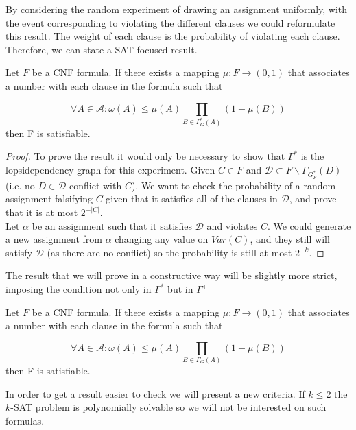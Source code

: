 By considering the random experiment of drawing an assignment uniformly, with the event corresponding to violating the different clauses we could reformulate this result. The weight of each clause is the probability of violating each clause. Therefore, we can state a SAT-focused result.

\begin{corollary}\label{LLLS}
	Let $F$ be a CNF formula. If there exists a mapping $\mu:F\to (0,1)$ that associates a number with each clause in the formula such that 
	
	$$
\forall A \in \mathcal{A} : \omega (A) \le \mu(A) \prod_{B\in\Gamma^*_G(A)} (1-\mu(B))
$$
	then F is satisfiable.
\end{corollary}
\begin{proof}
	To prove the result it would only be necessary to show  that $ \Gamma^*$ is the lopsidependency graph for this experiment. Given $C \in F$ and $\mathcal{D}\subset F\backslash \Gamma_{G_F^*}(D)\ $(i.e. no $D \in  \mathcal{D}$ conflict with $C$). We want to check the probability of a random assignment falsifying $C$ given that it satisfies all of the clauses in $\mathcal{D}$, and prove that it is at most $2^{-|C|}$. \\ 
	
Let $\alpha$ be an assignment such that it satisfies $\mathcal{D}$ and violates $C$. We could generate a new assignment from $\alpha$ changing any value on $Var(C)$, and they still will satisfy $\mathcal{D}$ (as there are no conflict) so the probability is still at most $2^{-k}$. 


\end{proof}


The result that we will prove in a constructive way will be slightly more strict, imposing the condition not only in $\Gamma^*$ but in $\Gamma^+$ 


\begin{corollary}\label{LLLSC}
	Let $F$ be a CNF formula. If there exists a mapping $\mu:F\to (0,1)$ that associates a number with each clause in the formula such that 
	
	$$
\forall A \in \mathcal{A} : \omega (A) \le \mu(A) \prod_{B\in\Gamma_G(A)} (1-\mu(B))
$$
	then F is satisfiable.
\end{corollary}


In order to get a result easier to check we will present a new criteria. If $k\le 2$ the $k$-SAT problem is  polynomially solvable so we will not be interested on such formulas.

